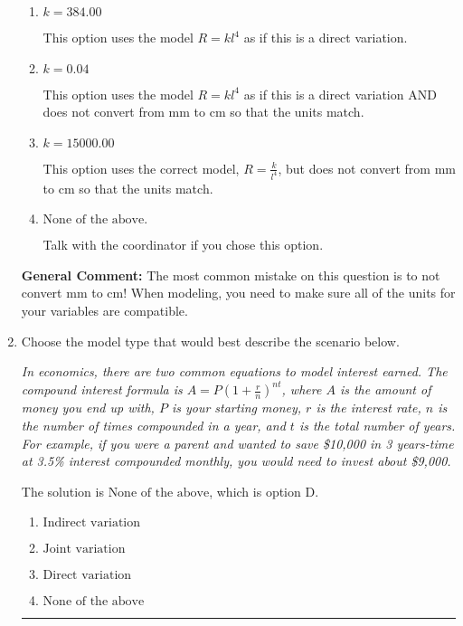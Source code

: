 \documentclass{extbook}[14pt]
\newcommand{\litem}[1]{\item #1

\rule{\textwidth}{0.4pt}}
\begin{document}
\begin{enumerate}
{\begin{enumerate}[label=\Alph*.]
* This is the correct option, which corresponds to the model $R = \frac{k}{l^{4}}$ AND converts from mm to cm.
\item \( k = 384.00 \)

This option uses the model $R = kl^{4}$ as if this is a direct variation.
\item \( k = 0.04 \)

This option uses the model $R = kl^{4}$ as if this is a direct variation AND does not convert from mm to cm so that the units match.
\item \( k = 15000.00 \)

This option uses the correct model, $R = \frac{k}{l^{4}}$, but does not convert from mm to cm so that the units match.
\item \( \text{None of the above.} \)

Talk with the coordinator if you chose this option.
\end{enumerate}

\textbf{General Comment:} The most common mistake on this question is to not convert mm to cm! When modeling, you need to make sure all of the units for your variables are compatible.
}
\litem{
Choose the model type that would best describe the scenario below.

\begin{center}
    \textit{ In economics, there are two common equations to model interest earned. The compound interest formula is $A = P (1 + \frac{r}{n})^{nt}$, where $A$ is the amount of money you end up with, $P$ is your starting money, $r$ is the interest rate, $n$ is the number of times compounded in a year, and $t$ is the total number of years. For example, if you were a parent and wanted to save \$10,000 in 3 years-time at 3.5\% interest compounded monthly, you would need to invest about \$9,000. }
\end{center}
The solution is \( \text{None of the above} \), which is option D.\begin{enumerate}[label=\Alph*.]
\item \( \text{Indirect variation} \)


\item \( \text{Joint variation} \)


\item \( \text{Direct variation} \)


\item \( \text{None of the above} \)


\end{enumerate}

}
\end{enumerate}
\end{document}
